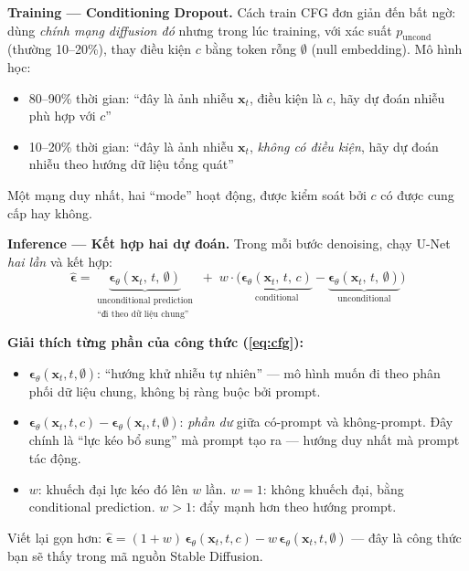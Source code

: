 \textbf{Training --- Conditioning Dropout.}
Cách train CFG đơn giản đến bất ngờ: dùng \textit{chính mạng diffusion đó} nhưng trong lúc training, với xác suất $p_\text{uncond}$ (thường 10--20\%), thay điều kiện $c$ bằng token rỗng $\emptyset$ (null embedding). Mô hình học:
\begin{itemize}
    \item 80--90\% thời gian: ``đây là ảnh nhiễu $\mathbf{x}_t$, điều kiện là $c$, hãy dự đoán nhiễu phù hợp với $c$''
    \item 10--20\% thời gian: ``đây là ảnh nhiễu $\mathbf{x}_t$, \textit{không có điều kiện}, hãy dự đoán nhiễu theo hướng dữ liệu tổng quát''
\end{itemize}
Một mạng duy nhất, hai ``mode'' hoạt động, được kiểm soát bởi $c$ có được cung cấp hay không.

\textbf{Inference --- Kết hợp hai dự đoán.}
Trong mỗi bước denoising, chạy U-Net \textit{hai lần} và kết hợp:
\begin{equation}
    \hat{\boldsymbol{\epsilon}} = \underbrace{\boldsymbol{\epsilon}_\theta(\mathbf{x}_t,\, t,\, \emptyset)}_{\substack{\text{unconditional prediction} \\ \text{``đi theo dữ liệu chung''}}}
    \;+\; w \cdot \Big(\underbrace{\boldsymbol{\epsilon}_\theta(\mathbf{x}_t,\, t,\, c)}_{\text{conditional}} - \underbrace{\boldsymbol{\epsilon}_\theta(\mathbf{x}_t,\, t,\, \emptyset)}_{\text{unconditional}}\Big)
    \label{eq:cfg}
\end{equation}

\textbf{Giải thích từng phần của công thức (\ref{eq:cfg}):}
\begin{itemize}
    \item $\boldsymbol{\epsilon}_\theta(\mathbf{x}_t, t, \emptyset)$: ``hướng khử nhiễu tự nhiên'' --- mô hình muốn đi theo phân phối dữ liệu chung, không bị ràng buộc bởi prompt.
    \item $\boldsymbol{\epsilon}_\theta(\mathbf{x}_t, t, c) - \boldsymbol{\epsilon}_\theta(\mathbf{x}_t, t, \emptyset)$: \textit{phần dư} giữa có-prompt và không-prompt. Đây chính là ``lực kéo bổ sung'' mà prompt tạo ra --- hướng duy nhất mà prompt tác động.
    \item $w$: khuếch đại lực kéo đó lên $w$ lần. $w=1$: không khuếch đại, bằng conditional prediction. $w > 1$: đẩy mạnh hơn theo hướng prompt.
\end{itemize}

Viết lại gọn hơn: $\hat{\boldsymbol{\epsilon}} = (1+w)\,\boldsymbol{\epsilon}_\theta(\mathbf{x}_t, t, c) - w\,\boldsymbol{\epsilon}_\theta(\mathbf{x}_t, t, \emptyset)$ --- đây là công thức bạn sẽ thấy trong mã nguồn Stable Diffusion.

